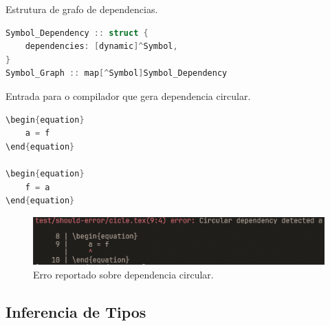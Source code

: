 \begin{codigo}[htb]
    \caption{\small Estrutura de grafo de dependencias. }
    \label{cod-symbol-graph}
\begin{lstlisting}[language=C, frame=none, inputencoding=utf8]
Symbol_Dependency :: struct {
    dependencies: [dynamic]^Symbol,
}
Symbol_Graph :: map[^Symbol]Symbol_Dependency
\end{lstlisting}
\end{codigo}


\begin{codigo}[htb]
    \caption{\small Entrada para o compilador que gera dependencia circular. }
    \label{cod-grafo-simbol-deps}
\begin{lstlisting}[language=C, numbers=none, frame=none, inputencoding=latin1]
\begin{equation}
    a = f
\end{equation}

\begin{equation}
    f = a
\end{equation}

\end{lstlisting}
\end{codigo}

\begin{figure}[H]
    \caption{\label{label} \small Erro reportado sobre dependencia circular.}
    \begin{center}
        \includegraphics[scale=0.5]{./Imagens/error-circular-deps.png}
    \end{center}
\end{figure}


\subsection{Inferencia de Tipos} \label{subsection-inferencia-tipos}


